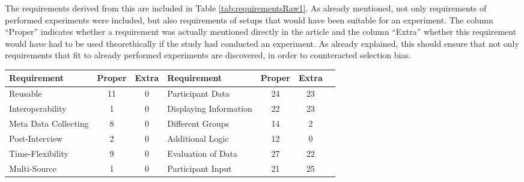 The requirements derived from this are included in Table \ref{tab:requirementsRaw1}. As already mentioned, not only requirements of performed experiments were included, but also requirements of setups that would have been suitable for an experiment. The column \enquote{Proper} indicates whether a requirement was actually mentioned directly in the article and the column \enquote{Extra} whether this requirement would have had to be used theorethically if the study had conducted an experiment. As already explained, this should ensure that not only requirements that fit to already performed experiments are discovered, in order to counteracted selection bias.

    \begin{table}[htbp]
        \centering
        \small
        \begin{tabular}{lcclccc}
        \hline
        Requirement          & \multicolumn{1}{l}{Proper} & \multicolumn{1}{l}{Extra} & Requirement & \multicolumn{1}{l}{Proper} & \multicolumn{1}{l}{Extra} \\ \hline
        Reusable                                                  & 11                         & 0                         & Participant Data                                           & 24                         & 23                        \\
        Interoperability                                           & 1                          & 0                         & Displaying Information                                     & 22                         & 23                        \\
        Meta Data Collecting                                       & 8                          & 0                         & Different Groups                                           & 14                         & 2                         \\
        Post-Interview                                             & 2                          & 0                         & Additional Logic                                           & 12                         & 0                         \\
        Time-Flexibility                                           & 9                          & 0                         & Evaluation of Data                                         & 27                         & 22                        \\
        Multi-Source                                               & 1                          & 0                         & Participant Input                                          & 21                         & 25                        \\

\end{tabular}
\end{table}
